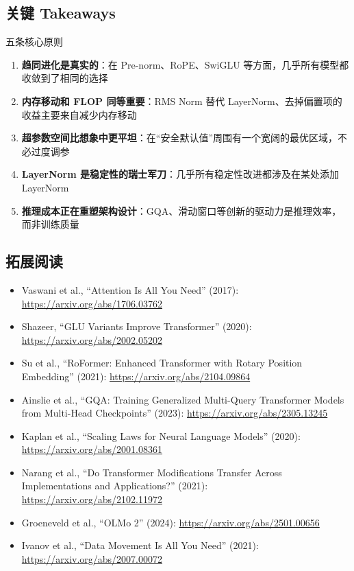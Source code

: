 \subsection{关键 Takeaways}

\begin{importantbox}{五条核心原则}
\begin{enumerate}
    \item \textbf{趋同进化是真实的}：在 Pre-norm、RoPE、SwiGLU 等方面，几乎所有模型都收敛到了相同的选择
    \item \textbf{内存移动和 FLOP 同等重要}：RMS Norm 替代 LayerNorm、去掉偏置项的收益主要来自减少内存移动
    \item \textbf{超参数空间比想象中更平坦}：在``安全默认值''周围有一个宽阔的最优区域，不必过度调参
    \item \textbf{LayerNorm 是稳定性的瑞士军刀}：几乎所有稳定性改进都涉及在某处添加 LayerNorm
    \item \textbf{推理成本正在重塑架构设计}：GQA、滑动窗口等创新的驱动力是推理效率，而非训练质量
\end{enumerate}
\end{importantbox}

\subsection{拓展阅读}

\begin{itemize}
    \item Vaswani et al., ``Attention Is All You Need'' (2017): \url{https://arxiv.org/abs/1706.03762}
    \item Shazeer, ``GLU Variants Improve Transformer'' (2020): \url{https://arxiv.org/abs/2002.05202}
    \item Su et al., ``RoFormer: Enhanced Transformer with Rotary Position Embedding'' (2021): \url{https://arxiv.org/abs/2104.09864}
    \item Ainslie et al., ``GQA: Training Generalized Multi-Query Transformer Models from Multi-Head Checkpoints'' (2023): \url{https://arxiv.org/abs/2305.13245}
    \item Kaplan et al., ``Scaling Laws for Neural Language Models'' (2020): \url{https://arxiv.org/abs/2001.08361}
    \item Narang et al., ``Do Transformer Modifications Transfer Across Implementations and Applications?'' (2021): \url{https://arxiv.org/abs/2102.11972}
    \item Groeneveld et al., ``OLMo 2'' (2024): \url{https://arxiv.org/abs/2501.00656}
    \item Ivanov et al., ``Data Movement Is All You Need'' (2021): \url{https://arxiv.org/abs/2007.00072}
\end{itemize}


